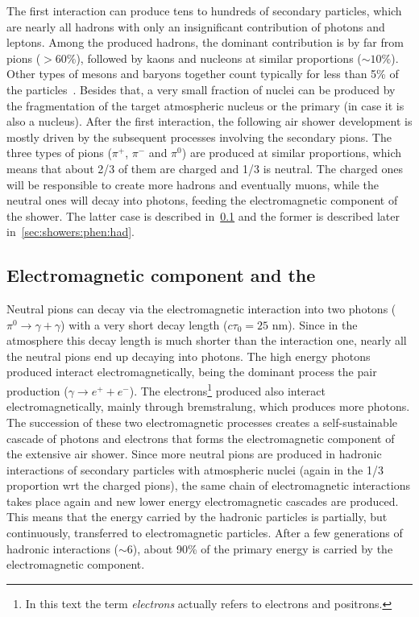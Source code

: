 The first interaction can produce tens to hundreds of
secondary particles, which are nearly all hadrons
with only an insignificant contribution of photons and leptons.
Among the produced hadrons, the dominant contribution is by far from pions ($>60\%$),
followed by kaons and nucleons at similar proportions ($\sim 10\%$). Other
types of mesons and baryons together count typically for less than 5\% of
the particles~\cite{Calcagni:2017tws}.
Besides that, a very small fraction of nuclei can be produced
by the fragmentation of the target atmospheric nucleus or the primary (in case it is also a nucleus).
After the first interaction, the following air shower development is mostly driven
by the subsequent processes involving the secondary pions.
The three types of pions ($\pi^+$, $\pi^-$ and $\pi^0$)
are produced at similar proportions, which means that about 2/3 of them are charged and
1/3 is neutral. The charged ones will be responsible to create more
hadrons and eventually muons, while the neutral ones will decay into photons,
feeding the electromagnetic component of the shower.
The latter case is described in~\cref{sec:showers:phen:em}
and the former is described later in~\cref{sec:showers:phen:had}. 

\subsection[Electromagnetic component and the \xmax]{\boldmath Electromagnetic component and the \xmax}
\label{sec:showers:phen:em}


Neutral pions can decay via the electromagnetic interaction
into two photons ($\pi^0\rightarrow \gamma+\gamma$)
with a very short decay length ($c\tau_0=25$ nm). Since in the atmosphere this decay length
is much shorter than the interaction one, nearly all the neutral pions end up decaying into
photons. The high energy photons produced interact electromagnetically, being the dominant
process the pair production ($\gamma\rightarrow e^++e^-$).
The electrons\footnote{In this text the term \emph{electrons} actually refers to electrons and positrons.} 
produced also interact electromagnetically, mainly through bremstralung, which
produces more photons. The succession of these two electromagnetic processes
creates a self-sustainable cascade of photons and electrons
that forms the electromagnetic component of the extensive air shower.
Since more neutral pions are produced in hadronic interactions of secondary
particles with atmospheric nuclei (again in the 1/3 proportion wrt the charged pions),
the same chain of electromagnetic interactions takes place again
and new lower energy electromagnetic cascades are produced.
This means that the energy carried by the hadronic particles
is partially, but continuously, transferred to electromagnetic particles.
After a few generations of hadronic interactions ($\sim 6$), about 90\% of
the primary energy is carried by the electromagnetic component.


